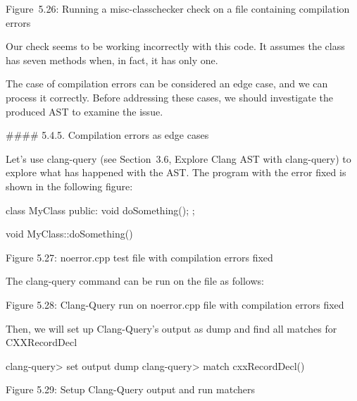 \begin{center}
Figure 5.26: Running a misc-classchecker check on a file containing compilation errors
\end{center}

Our check seems to be working incorrectly with this code. It assumes the class has seven methods when, in fact, it has only one.

The case of compilation errors can be considered an edge case, and we can process it correctly. Before addressing these cases, we should investigate the produced AST to examine the issue.

\begin{markdown}
#### 5.4.5. Compilation errors as edge cases
\end{markdown}

Let's use clang-query (see Section 3.6, Explore Clang AST with clang-query) to explore what has happened with the AST. The program with the error fixed is shown in the following figure:

\begin{cpp}
class MyClass {
public:
  void doSomething();
};

void MyClass::doSomething() {}
\end{cpp}


\begin{center}
Figure 5.27: noerror.cpp test file with compilation errors fixed
\end{center}

The clang-query command can be run on the file as follows:


\begin{center}
Figure 5.28: Clang-Query run on noerror.cpp file with compilation errors fixed
\end{center}

Then, we will set up Clang-Query's output as dump and find all matches for CXXRecordDecl

\begin{shell}
clang-query> set output dump
clang-query> match cxxRecordDecl()
\end{shell}

\begin{center}
Figure 5.29: Setup Clang-Query output and run matchers
\end{center}

